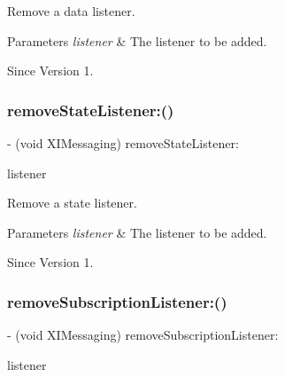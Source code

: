 Remove a data listener. 


\begin{DoxyParams}{Parameters}
{\em listener} & The listener to be added. \\
\hline
\end{DoxyParams}
\begin{DoxySince}{Since}
Version 1. 
\end{DoxySince}
\hypertarget{protocol_x_i_messaging_01-p_a45b3e767df76eb04c7bc750f206b28c5}{}\label{protocol_x_i_messaging_01-p_a45b3e767df76eb04c7bc750f206b28c5} 
\subsubsection{\texorpdfstring{remove\+State\+Listener\+:()}{removeStateListener:()}}
{\footnotesize\ttfamily -\/ (void X\+I\+Messaging) remove\+State\+Listener\+: \begin{DoxyParamCaption}\item[{(id$<$ X\+I\+Messaging\+State\+Listener $>$)}]{listener }\end{DoxyParamCaption}}



Remove a state listener. 


\begin{DoxyParams}{Parameters}
{\em listener} & The listener to be added. \\
\hline
\end{DoxyParams}
\begin{DoxySince}{Since}
Version 1. 
\end{DoxySince}
\hypertarget{protocol_x_i_messaging_01-p_a8e4b91527ad72342dfa47b67e33f9cde}{}\label{protocol_x_i_messaging_01-p_a8e4b91527ad72342dfa47b67e33f9cde} 
\subsubsection{\texorpdfstring{remove\+Subscription\+Listener\+:()}{removeSubscriptionListener:()}}
{\footnotesize\ttfamily -\/ (void X\+I\+Messaging) remove\+Subscription\+Listener\+: \begin{DoxyParamCaption}\item[{(id$<$ X\+I\+Messaging\+Subscription\+Listener $>$)}]{listener }\end{DoxyParamCaption}}



